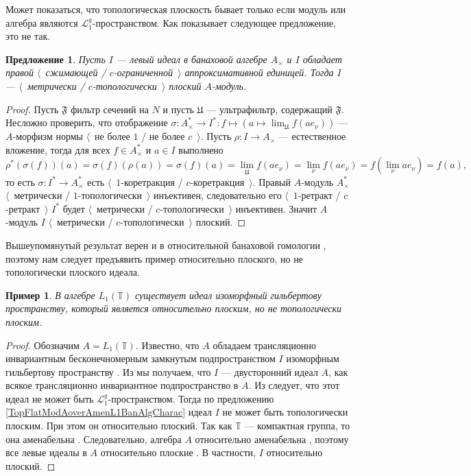 \documentclass[12pt]{article}
\newtheorem{proposition}[theorem]{Предложение}
\newtheorem{example}[theorem]{Пример}
\begin{document}
Может показаться, что топологическая плоскость бывает только если модуль или алгебра являются $\mathcal{L}_1^g$-пространством. Как показывает следующее предложение, это не так.

\begin{proposition}\label{MetTopFlatIdealsInUnitalAlg} Пусть $I$ --- левый идеал в банаховой алгебре $A_\times $ и $I$ обладает правой $\langle$~сжимающей / $c$-ограниченной~$\rangle$ аппроксимативной единицей. Тогда $I$ --- $\langle$~метрически / $c$-топологически~$\rangle$ плоский $A$-модуль.
\end{proposition}
\begin{proof} Пусть $\mathfrak{F}$ фильтр сечений на $N$ и пусть $\mathfrak{U}$ --- ультрафильтр, содержащий $\mathfrak{F}$. Несложно проверить, что отображение $\sigma:A_\times ^*\to I^*:f\mapsto (a\mapsto \lim_{\mathfrak{U}}f(ae_\nu))$ --- $A$-морфизм нормы $\langle$~не более $1$ / не более $c$~$\rangle$. Пусть $\rho:I\to A_\times$ --- естественное вложение, тогда для всех $f\in A_\times^*$ и $a\in I$ выполнено
\[
\rho^*(\sigma(f))(a)
=\sigma(f)(\rho(a))
=\sigma(f)(a)
=\lim_{\mathfrak{U}}f(a e_\nu)
=\lim_{\nu}f(a e_\nu)
=f(\lim_{\nu}a e_\nu)
=f(a),
\]
то есть $\sigma:I^*\to A_\times^*$ есть $\langle$~$1$-коретракция / $c$-коретракция~$\rangle$. Правый $A$-модуль $A_\times ^*$ $\langle$~метрически / $1$-топологически~$\rangle$ инъективен, следовательно его $\langle$~$1$-ретракт / $c$-ретракт~$\rangle$ $I^*$ будет $\langle$~метрически / $c$-топологически~$\rangle$ инъективен. Значит $A$-модуль $I$  $\langle$~метрически / $c$-топологически~$\rangle$ плоский.
\end{proof}

Вышеупомянутый результат верен и в относительной банаховой гомологии \cite[предложение 7.1.45]{HelBanLocConvAlg}, поэтому нам следует предъявить пример относительно плоского, но не топологически плоского идеала.

\begin{example} В алгебре $L_1(\mathbb{T})$ существует идеал изоморфный гильбертову пространству, который является относительно плоским, но не топологически плоским.
\end{example}
\begin{proof}
Обозначим $A=L_1(\mathbb{T})$. Известно, что $A$ обладаем трансляционно инвариантным бесконечномерным замкнутым подпространством $I$ изоморфным гильбертову пространству \cite[страница 52]{RosProjTransInvSbspLpG}. Из \cite[предложение 1.4.7]{KaniBanAlg} мы получаем, что $I$ --- двусторонний идеал $A$, как всякое трансляционно инвариантное подпространство в $A$. Из \cite[параграф 23.3]{DefFloTensNorOpId} следует, что этот идеал не может быть $\mathcal{L}_1^g$-пространством. Тогда по предложению \ref{TopFlatModAoverAmenL1BanAlgCharac} идеал $I$ не может быть топологически плоским. При этом он относительно плоский. Так как $\mathbb{T}$ --- компактная группа, то она аменабельна \cite[предложение 3.12.1]{PierAmenLCA}. Следовательно, алгебра $A$ относительно аменабельна \cite[предложение VII.1.86]{HelBanLocConvAlg}, поэтому все левые идеалы в $A$ относительно плоские \cite[предложение VII.1.60(I)]{HelBanLocConvAlg}. В частности, $I$ относительно плоский.
\end{proof}
\end{document}

